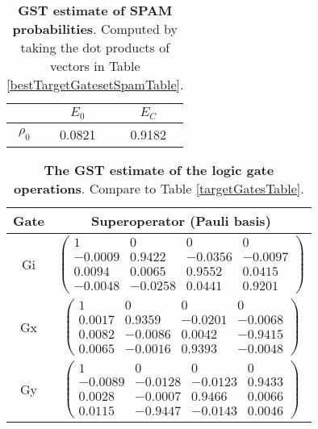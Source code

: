 {\begin{table}[h]
\begin{center}
\begin{tabular}[l]{|c|c|c|}
\hline
 & $E_{0}$ & $E_C$ \\ \hline
$\rho_{0}$ & 0.0821 & 0.9182 \\ \hline
\end{tabular}

\caption{\textbf{GST estimate of SPAM probabilities}.  Computed by taking the dot products of vectors in Table \ref{bestTargetGatesetSpamTable}.\label{bestTargetGatesetSpamParametersTable}}
\end{center}
\end{table}

\begin{table}[h]
\begin{center}
\begin{tabular}[l]{|c|c|}
\hline
Gate & Superoperator (Pauli basis) \\ \hline
Gi & $ \left(\!\!\begin{array}{cccc}
1 & 0 & 0 & 0 \\ 
-0.0009 & 0.9422 & -0.0356 & -0.0097 \\ 
0.0094 & 0.0065 & 0.9552 & 0.0415 \\ 
-0.0048 & -0.0258 & 0.0441 & 0.9201
 \end{array}\!\!\right) $
 \\ \hline
Gx & $ \left(\!\!\begin{array}{cccc}
1 & 0 & 0 & 0 \\ 
0.0017 & 0.9359 & -0.0201 & -0.0068 \\ 
0.0082 & -0.0086 & 0.0042 & -0.9415 \\ 
0.0065 & -0.0016 & 0.9393 & -0.0048
 \end{array}\!\!\right) $
 \\ \hline
Gy & $ \left(\!\!\begin{array}{cccc}
1 & 0 & 0 & 0 \\ 
-0.0089 & -0.0128 & -0.0123 & 0.9433 \\ 
0.0028 & -0.0007 & 0.9466 & 0.0066 \\ 
0.0115 & -0.9447 & -0.0143 & 0.0046
 \end{array}\!\!\right) $
 \\ \hline
\end{tabular}

\caption{\textbf{The GST estimate of the logic gate operations}.  Compare to Table \ref{targetGatesTable}.\label{bestTargetGatesetGatesTable}}
\end{center}
\end{table}

}
